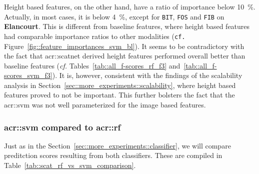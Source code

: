             Height based features, on the other hand, have a ratio of importance below \SI{10}{\percent}.
            Actually, in most cases, it is below \SI{4}{\percent}, except for \texttt{BIT}, \texttt{FOS} and \texttt{FIB} on \textbf{Elancourt}.
            This is different from baseline features, where height based features had comparable importance ratios to other modalities (\texttt{cf.} Figure~\ref{fig::feature_importances_svm_bl}).
            It seems to be contradictory with the fact that \gls{acr::scatnet} derived height features performed overall better than baseline features (\textit{cf.} Tables~\ref{tab::all_f-scores_rf_f3} and~\ref{tab::all_f-scores_svm_f3}).
            It is, however, consistent with the findings of the scalability analysis in Section~\ref{sec::more_experiments::scalability}, where height based features proved to not be important.
            This further bolsters the fact that the \gls{acr::svm} was not well parameterized for the image based features.\\

        \subsubsection{\texorpdfstring{\acrshort*{acr::svm}}{SVM} compared to \texorpdfstring{\acrshort*{acr::rf}}{RF}}
            \label{subsubsec::more_experiments::richer_features::scatnet_baseline::svm_rf}
            Just as in the Section~\ref{sec::more_experiments::classifier}, we will compare preditction scores resulting from both classifiers.
            These are compiled in Table~\ref{tab::scat_rf_vs_svm_comparison}.

